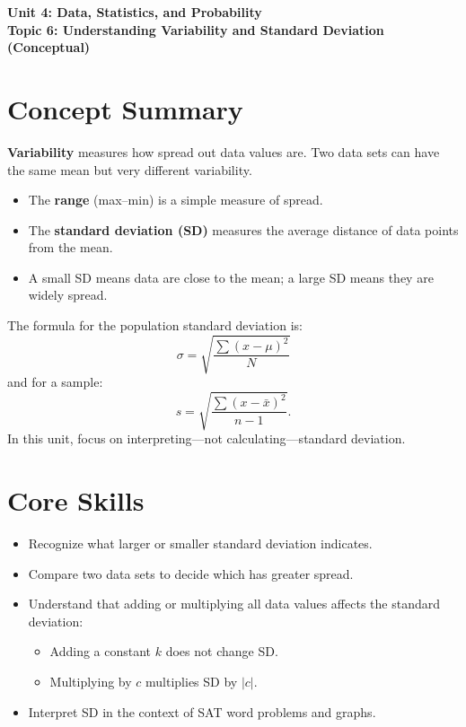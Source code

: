 \documentclass[12pt]{article}
\begin{document}
\begin{center}
    \LARGE \textbf{Unit 4: Data, Statistics, and Probability} \\[6pt]
    \Large \textbf{Topic 6: Understanding Variability and Standard Deviation (Conceptual)}
\end{center}

\vspace{1em}

\section*{Concept Summary}

\textbf{Variability} measures how spread out data values are. Two data sets can have the same mean but very different variability.

\begin{itemize}
  \item The \textbf{range} (max–min) is a simple measure of spread.
  \item The \textbf{standard deviation (SD)} measures the average distance of data points from the mean.
  \item A small SD means data are close to the mean; a large SD means they are widely spread.
\end{itemize}

The formula for the population standard deviation is:
\[
\sigma = \sqrt{\frac{\sum (x - \mu)^2}{N}}
\]
and for a sample:
\[
s = \sqrt{\frac{\sum (x - \bar{x})^2}{n-1}}.
\]
In this unit, focus on interpreting—not calculating—standard deviation.

\section*{Core Skills}
\begin{itemize}
  \item Recognize what larger or smaller standard deviation indicates.
  \item Compare two data sets to decide which has greater spread.
  \item Understand that adding or multiplying all data values affects the standard deviation:
  \begin{itemize}
    \item Adding a constant \(k\) does not change SD.
    \item Multiplying by \(c\) multiplies SD by \(|c|\).
  \end{itemize}
  \item Interpret SD in the context of SAT word problems and graphs.
\end{itemize}
\end{document}
